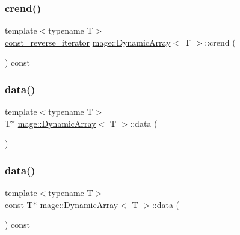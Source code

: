 \mbox{\label{classmage_1_1_dynamic_array_a8cf78a785d961d9e90e57a060d46e03f}} 
\subsubsection{\texorpdfstring{crend()}{crend()}}
{\footnotesize\ttfamily template$<$typename T$>$ \\
\mbox{\hyperlink{classmage_1_1_dynamic_array_afbcc530c2cd68cc3b0474a4b1a5c6a15}{const\+\_\+reverse\+\_\+iterator}} \mbox{\hyperlink{classmage_1_1_dynamic_array}{mage\+::\+Dynamic\+Array}}$<$ T $>$\+::crend (\begin{DoxyParamCaption}{ }\end{DoxyParamCaption}) const\hspace{0.3cm}{\ttfamily [noexcept]}}

\mbox{\label{classmage_1_1_dynamic_array_a5653f65f6b0aa366dc5cb40594088ddc}} 
\subsubsection{\texorpdfstring{data()}{data()}\hspace{0.1cm}{\footnotesize\ttfamily [1/2]}}
{\footnotesize\ttfamily template$<$typename T$>$ \\
T$\ast$ \mbox{\hyperlink{classmage_1_1_dynamic_array}{mage\+::\+Dynamic\+Array}}$<$ T $>$\+::data (\begin{DoxyParamCaption}{ }\end{DoxyParamCaption})\hspace{0.3cm}{\ttfamily [noexcept]}}

\mbox{\label{classmage_1_1_dynamic_array_a52e0d7e1525ec918998df1855302ec52}} 
\subsubsection{\texorpdfstring{data()}{data()}\hspace{0.1cm}{\footnotesize\ttfamily [2/2]}}
{\footnotesize\ttfamily template$<$typename T$>$ \\
const T$\ast$ \mbox{\hyperlink{classmage_1_1_dynamic_array}{mage\+::\+Dynamic\+Array}}$<$ T $>$\+::data (\begin{DoxyParamCaption}{ }\end{DoxyParamCaption}) const\hspace{0.3cm}{\ttfamily [noexcept]}}

